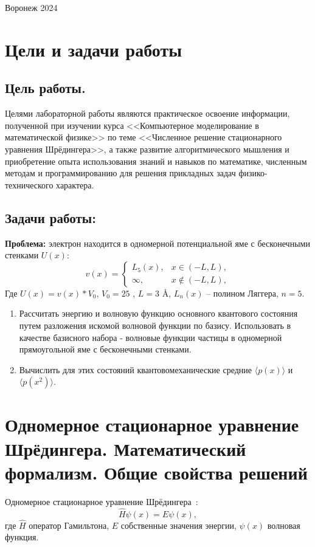 \documentclass[a4paper,12pt]{article}
\begin{document}
\vspace{3cm}
\begin{center}
Воронеж 2024
\end{center}

\newpage
\tableofcontents
\pagestyle{plain}
\setcounter{page}{2}

\newpage
\section{Цели и задачи работы}\label{sec:goals}
\subsection{Цель работы.}\label{subsec:-.}
Целями лабораторной работы являются практическое освоение информации, полученной при изучении курса <<Компьютерное моделирование в математической физике>> по теме <<Численное решение стационарного уравнения Шрёдингера>>, а также развитие алгоритмического мышления и приобретение опыта использования знаний и навыков по математике, численным методам и программированию для решения прикладных задач физико-технического характера.

\subsection{Задачи работы:}\label{subsec:-:}

\textbf{Проблема:} электрон находится в одномерной потенциальной яме с бесконечными стенками $U(x)$:
\[
v(x) =
    \begin{cases}
        L_5(x), & x \in (-L, L), \\
        \infty, & x \notin (-L, L),
    \end{cases}
\]
Где $U(x) = v(x)*V_0$, $V_0 = 25$ , $L = 3$ \AA, $L_n(x)$ -- полином Ляггера, $n = 5$.

\begin{enumerate}
    \item Рассчитать энергию и волновую функцию основного квантового состояния путем разложения искомой волновой функции по базису.
          Использовать в качестве базисного набора - волновые функции частицы в одномерной прямоугольной яме с бесконечными стенками.
    \item Вычислить для этих состояний квантовомеханические средние $\langle p(x) \rangle$ и $ \langle p(x^2) \rangle $.
\end{enumerate}

\newpage
\section{Одномерное стационарное уравнение Шрёдингера. Математический формализм. Общие свойства решений}\label{sec:-}
Одномерное стационарное уравнение Шрёдингера~\cite{tim_shrod}:
\begin{equation}
    \hat{H}\psi(x) = E\psi(x),
    \label{eq:oneDimShrodingerEq}
\end{equation}
где $\hat{H}$ \textendash{} оператор Гамильтона, $E$ \textendash{} собственные значения энергии, $\psi(x)$ \textendash{} волновая функция.
\end{document}
